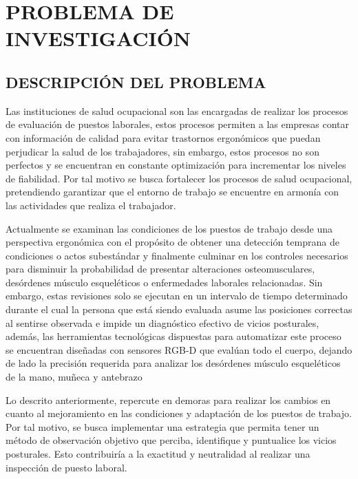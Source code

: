 \chapter{PROBLEMA DE INVESTIGACIÓN}

\section{DESCRIPCIÓN DEL PROBLEMA}
Las instituciones de salud ocupacional son las encargadas de realizar los procesos de evaluación de puestos laborales, estos procesos permiten a las empresas contar con información de calidad para evitar trastornos ergonómicos que puedan perjudicar la salud de los trabajadores, sin embargo, estos procesos no son perfectos y se encuentran en constante optimización para incrementar los niveles de fiabilidad. Por tal motivo se busca fortalecer los procesos de salud ocupacional, pretendiendo garantizar que el entorno de trabajo se encuentre en armonía con las actividades que realiza el trabajador. %

Actualmente se examinan las condiciones de los puestos de trabajo desde una perspectiva ergonómica con el propósito de obtener una detección temprana de condiciones o actos subestándar y finalmente culminar en los controles necesarios para disminuir la probabilidad de presentar alteraciones osteomusculares, desórdenes músculo esqueléticos o enfermedades laborales relacionadas. Sin embargo, estas revisiones solo se ejecutan en un intervalo de tiempo determinado durante el cual la persona que está siendo evaluada asume las posiciones correctas al sentirse observada e impide un diagnóstico efectivo de vicios posturales, además, las herramientas tecnológicas dispuestas para automatizar este proceso se encuentran diseñadas con sensores RGB-D que evalúan todo el cuerpo, dejando de lado la precisión requerida para analizar los desórdenes músculo esqueléticos de la mano, muñeca y antebrazo

Lo descrito anteriormente, repercute en demoras para realizar los cambios en cuanto al mejoramiento en las condiciones y adaptación de los puestos de trabajo. Por tal motivo, se busca implementar una estrategia que permita tener un método de observación objetivo que perciba, identifique y puntualice los vicios posturales. Esto contribuiría a la exactitud y neutralidad al realizar una inspección de puesto laboral.

